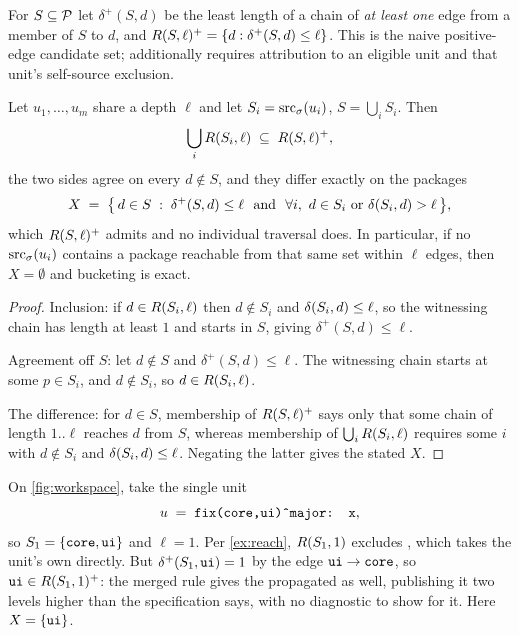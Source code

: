 \begin{definition}
For $S \subseteq \mathcal{P}$ let $\delta^{+}(S,d)$ be the least length of a chain of
\emph{at least one} edge from a member of $S$ to $d$, and $R(S,\ell)^{+}
= \{d : \delta^{+}(S,d) \leq \ell\}$. This is the naive positive-edge candidate set; \SPEC{} additionally requires attribution to an eligible unit and that unit's self-source exclusion.
\end{definition}

\begin{proposition}
\label{prop:bucket}
Let $u_1,\dots,u_m$ share a depth $\ell$ and let $S_i = \mathrm{src}_{\sigma}(u_i)$,
$S = \bigcup_i S_i$. Then
\[
  \bigcup_{i} R(S_i,\ell) \;\subseteq\; R(S,\ell)^{+},
\]
the two sides agree on every $d \notin S$, and they differ exactly on the
packages
\[
  X \;=\; \bigl\{\, d \in S \;:\; \delta^{+}(S,d) \leq \ell
      \ \text{ and }\ \forall i,\ d \in S_i \text{ or } \delta(S_i,d) > \ell \,\bigr\},
\]
which $R(S,\ell)^{+}$ admits and no individual traversal does. In
particular, if no $\mathrm{src}_{\sigma}(u_i)$ contains a package reachable from that same
set within $\ell$ edges, then $X = \emptyset$ and bucketing is exact.
\end{proposition}

\begin{proof}
Inclusion: if $d \in R(S_i,\ell)$ then $d \notin S_i$ and
$\delta(S_i,d) \leq \ell$, so the witnessing chain has length at least $1$ and
starts in $S$, giving $\delta^{+}(S,d) \leq \ell$.

Agreement off $S$: let $d \notin S$ and $\delta^{+}(S,d) \leq \ell$. The
witnessing chain starts at some $p \in S_i$, and $d \notin S_i$, so
$d \in R(S_i,\ell)$.

The difference: for $d \in S$, membership of $R(S,\ell)^{+}$ says only
that some chain of length $1..\ell$ reaches $d$ from $S$, whereas membership of
$\bigcup_i R(S_i,\ell)$ requires some $i$ with $d \notin S_i$ and
$\delta(S_i,d)\leq\ell$. Negating the latter gives the stated $X$.
\end{proof}

\begin{example}
\label{ex:bucket}
On \cref{fig:workspace}, take the single unit
\[
  u \;=\; \texttt{fix(core,ui)\^{}major: x},
\]
so $S_1 = \{\texttt{core},\texttt{ui}\}$ and $\ell = 1$. Per \cref{ex:reach},
$R(S_1,1)$ excludes , which takes the unit's own \bpatch{}
directly. But $\delta^{+}(S_1,\texttt{ui}) = 1$ by the edge
$\texttt{ui} \to \texttt{core}$, so $\texttt{ui} \in R(S_1,1)^{+}$: the
merged rule gives  the propagated \bmajor{} as well, publishing it two
levels higher than the specification says, with no diagnostic to show for it.
Here $X = \{\texttt{ui}\}$.
\end{example}

